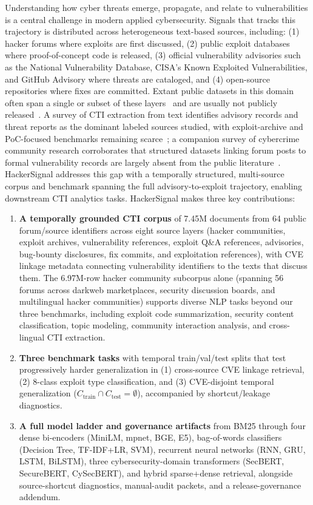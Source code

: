 \documentclass{article}
\begin{document}
Understanding how cyber threats emerge, propagate, and relate to vulnerabilities is a central challenge in modern applied cybersecurity. Signals that tracks this trajectory is distributed across heterogeneous text-based sources, including: (1) hacker forums where exploits are first discussed, (2) public exploit databases where proof-of-concept code is released, (3) official vulnerability advisories such as the National Vulnerability Database, CISA's Known Exploited Vulnerabilities, and GitHub Advisory where threats are cataloged, and (4) open-source repositories where fixes are committed. Extant public datasets in this domain often span a single or subset of these layers~\citep{crimebb2018} and are usually not publicly released~\citep{ampel2020dtl}. A survey of CTI extraction from text identifies advisory records and threat reports as the dominant labeled sources studied, with exploit-archive and PoC-focused benchmarks remaining scarce~\citep{rahman2023cti}; a companion survey of cybercrime community research corroborates that structured datasets linking forum posts to formal vulnerability records are largely absent from the public literature~\citep{hughes2024cybercrime}. HackerSignal addresses this gap with a temporally structured, multi-source corpus and benchmark spanning the full advisory-to-exploit trajectory, enabling downstream CTI analytics tasks. HackerSignal makes three key contributions:

\begin{enumerate}
  \item \textbf{A temporally grounded CTI corpus} of 7.45M documents from 64 public forum/source identifiers across eight source layers (hacker communities, exploit archives, vulnerability references, exploit Q\&A references, advisories, bug-bounty disclosures, fix commits, and exploitation references), with CVE linkage metadata connecting vulnerability identifiers to the texts that discuss them. The 6.97M-row hacker community subcorpus alone (spanning 56 forums across darkweb marketplaces, security discussion boards, and multilingual hacker communities) supports diverse NLP tasks beyond our three benchmarks, including exploit code summarization, security content classification, topic modeling, community interaction analysis, and cross-lingual CTI extraction.

  \item \textbf{Three benchmark tasks} with temporal train/val/test splits that test progressively harder generalization in (1) cross-source CVE linkage retrieval, (2) 8-class exploit type classification, and (3) CVE-disjoint temporal generalization ($C_{\text{train}} \cap C_{\text{test}} = \emptyset$), accompanied by shortcut/leakage diagnostics.

  \item \textbf{A full model ladder and governance artifacts} from BM25 through four dense bi-encoders (MiniLM, mpnet, BGE, E5), bag-of-words classifiers (Decision Tree, TF-IDF+LR, SVM), recurrent neural networks (RNN, GRU, LSTM, BiLSTM), three cybersecurity-domain transformers (SecBERT, SecureBERT, CySecBERT), and hybrid sparse+dense retrieval, alongside source-shortcut diagnostics, manual-audit packets, and a release-governance addendum.
\end{enumerate}
\end{document}
